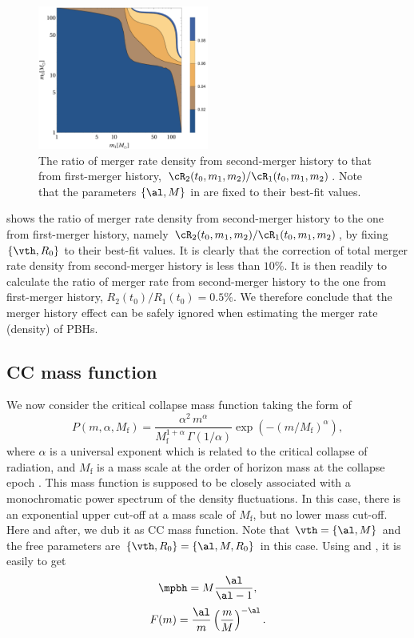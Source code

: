 \documentclass[
reprint,           %
superscriptaddress,%
amsmath,           %
amssymb,           %
aps,               %
prd,               %
notitlepage,       %
longbibliography,  %
floatfix,          %
showkeys,          %
]{revtex4-1}
\def\({\left(}
\def\){\right)}
\def\e{\begin{equation}}
\def\q{\end{equation}}
\begin{document}
\begin{figure}[htbp!]
	\centering
	\includegraphics[width=0.5\textwidth]{ratio-bpower.pdf}
	\caption{\label{ratio-bpower}
		The ratio of merger rate density from second-merger history
		to that from first-merger history,
		$\cR_2(t_0, m_1, m_2)/\cR_1(t_0, m_1, m_2)$. Note that the parameters $\{\al, M\}$ in  are fixed to their best-fit values.
	}
\end{figure}

 shows the ratio of merger rate density from second-merger history
to the one from first-merger history, namely 
$\cR_2(t_0, m_1, m_2)/\cR_1(t_0, m_1, m_2)$, by fixing $\{\vth, R_0\}$ to their best-fit values.
It is clearly that the correction of total merger rate density from 
second-merger history is less than $10\%$.
It is then readily to calculate the ratio of merger rate from 
second-merger history to the one from first-merger history, 
$R_2(t_0)/R_1(t_0) = 0.5\%$.
We therefore conclude that the merger history effect can be safely ignored
when estimating the merger rate (density) of PBHs.

\subsection{CC mass function}
We now consider the critical collapse mass function taking the form of \cite{Niemeyer:1997mt,Yokoyama:1998xd,Carr:2016hva,Gow:2020cou}
\e
P(m, \alpha, M_{\mathrm{f}})=\frac{\alpha^2\,  m^\alpha}{M_{\mathrm{f}}^{1+\alpha}\, \Gamma(1 / \alpha)} \exp \left(-(m/M_{\mathrm{f}})^{\alpha}\right),
\q
where $\alpha$ is a universal exponent which is related to the critical collapse of radiation, and $M_{\mathrm{f}}$ is a mass scale at the order of horizon mass at the collapse epoch \cite{Carr:2016hva}. This mass function is supposed to be closely associated with a monochromatic power spectrum of the density fluctuations. In this case, there is an exponential upper cut-off at a mass scale of $M_{\mathrm{f}}$, but no lower mass cut-off. Here and after, we dub it as CC mass function.
Note that $\vth=\{\al, M\}$ and the free parameters are 
$\{\vth, R_0\} = \{\al, M, R_0\}$ in this case. 
Using  and , it is easily to get
\e
\mpbh = M \frac{\al}{\al-1},
\q
\e 
F(m) = \frac{\al}{m} \(\frac{m}{M}\)^{-\al}.
\q
\end{document}
